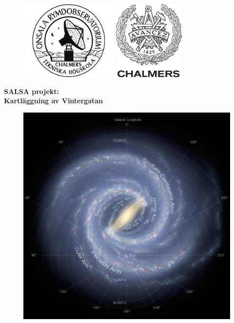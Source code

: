 \begin{titlepage}

\begin{figure}[t]
\vspace{-2cm}
\centering
\includegraphics[height=4cm]{../figures/OSO-logo.jpg}
\hspace{4cm}
\includegraphics[height=4cm]{../figures/CHALMERS-logo.pdf}
\vspace{1cm}
\end{figure}

\begin{center}
\Huge \textbf{
SALSA projekt: 		\\
\bigskip
Kartläggning av Vintergatan
}
\end{center}

\begin{figure}[!h]
\centering
\includegraphics[width=12cm]{../figures/Milky_Way_236084_annotated_small.jpg}
\end{figure}



\end{titlepage}
